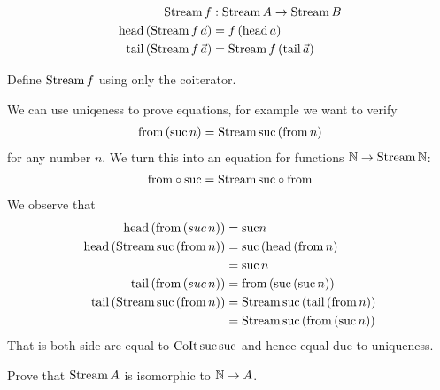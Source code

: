 \begin{align*}
\mathrm{Stream}\,f & : \mathrm{Stream}\,A \to \mathrm{Stream}\,B \\
\mathrm{head}\,(\mathrm{Stream}\,f\,\vec{a}) & = f\,(\mathrm{head}\,a) \\
\mathrm{tail}\,(\mathrm{Stream}\,f\,\vec{a}) & = \mathrm{Stream}\,f\,(\mathrm{tail}\,\vec{a})
\end{align*}
\begin{exercise}
  Define $\mathrm{Stream}\,f$ using only the coiterator.
\end{exercise}

We can use uniqeness to prove equations, for example we want to verify
\begin{align*}
\mathrm{from}\,(\mathrm{suc}\,n) = \mathrm{Stream}\,\mathrm{suc}\,(\mathrm{from}\,n)
\end{align*}
for any number $n$. We turn this into an equation for functions $\mathbb{N} \to \mathrm{Stream}\,\mathbb{N}$:
\begin{align*}
  \mathrm{from} \circ \mathrm{suc} = \mathrm{Stream}\,\mathrm{suc} \circ \mathrm{from}
\end{align*}
We observe that 
\begin{align*}
  \mathrm{head}\,(\mathrm{from}\,(suc\,n)) & = \mathrm{suc} n\\
  \mathrm{head}\,(\mathrm{Stream}\,\mathrm{suc}\,(\mathrm{from}\,n)) & = \mathrm{suc}\,(\mathrm{head}\,(\mathrm{from}\,n) \\
  & = \mathrm{suc}\,n\\
  \mathrm{tail}\, (\mathrm{from}\,(suc\,n)) & = \mathrm{from}\,(\mathrm{suc}\,(\mathrm{suc}\,n))\\
  \mathrm{tail}\, (\mathrm{Stream}\,\mathrm{suc}\,(\mathrm{from}\,n)) & = \mathrm{Stream}\,\mathrm{suc}\,(\mathrm{tail}\,(\mathrm{from}\,n))\\
                                        & = \mathrm{Stream}\,\mathrm{suc}\,(\mathrm{from}\,(\mathrm{suc}\,n))
\end{align*}
That is both side are equal to $\mathrm{CoIt}\,\mathrm{suc}\,\mathrm{suc}$ and hence equal due to uniqueness. 

\begin{exercise}
  Prove that $\mathrm{Stream}\,A$ is isomorphic to $\mathbb{N} \to A$.
\end{exercise}

